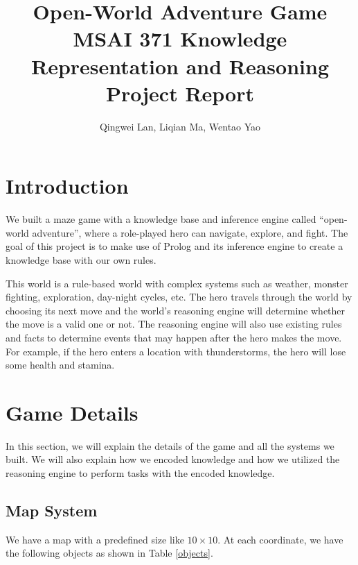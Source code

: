 \documentclass[10pt]{article}
\title{
    Open-World Adventure Game \\[.5cm]
    \normalsize MSAI 371 Knowledge Representation and Reasoning Project Report
}
\author{Qingwei Lan, Liqian Ma, Wentao Yao}
\begin{document}
\maketitle

\section{Introduction}

We built a maze game with a knowledge base and inference engine called “open-world adventure”, where a role-played hero can navigate, explore, and fight. The goal of this project is to make use of Prolog \cite{swiprolog} and its inference engine to create a knowledge base with our own rules.

This world is a rule-based world with complex systems such as weather, monster fighting, exploration, day-night cycles, etc. The hero travels through the world by choosing its next move and the world's reasoning engine will determine whether the move is a valid one or not. The reasoning engine will also use existing rules and facts to determine events that may happen after the hero makes the move. For example, if the hero enters a location with thunderstorms, the hero will lose some health and stamina.




\section{Game Details}

In this section, we will explain the details of the game and all the systems we built. We will also explain how we encoded knowledge and how we utilized the reasoning engine to perform tasks with the encoded knowledge.


\subsection{Map System}

We have a map with a predefined size like $10 \times 10$. At each coordinate, we have the following objects as shown in Table \ref{objects}.
\end{document}
